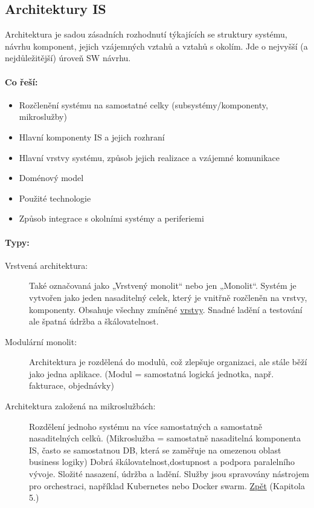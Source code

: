 \subsection{Architektury IS}
Architektura je sadou zásadních rozhodnutí týkajících se struktury 
systému, návrhu komponent, jejich vzájemných vztahů a vztahů s okolím.
Jde o nejvyšší (a nejdůležitější) úroveň SW návrhu.

\paragraph*{Co řeší:}
\begin{itemize}
    \item Rozčlenění systému na samostatné celky (subsystémy/komponenty, mikroslužby)
    \item Hlavní komponenty IS a jejich rozhraní
    \item Hlavní vrstvy systému, způsob jejich realizace a vzájemné komunikace
    \item Doménový model
    \item Použité technologie
    \item Způsob integrace s okolními systémy a periferiemi
\end{itemize}
\paragraph*{Typy:}
\begin{description}
    \item[Vrstvená architektura:] Také označovaná jako „Vrstvený monolit“ nebo jen „Monolit“.
    Systém je vytvořen jako jeden nasaditelný celek, který je 
    vnitřně rozčleněn na vrstvy, komponenty. Obsahuje všechny zmíněné \hyperref[sub:vrstvy]{vrstvy}.
    Snadné ladění a testování ale špatná údržba a škálovatelnost.
    \item[Modulární monolit:] Architektura je rozdělená do modulů, což zlepšuje
    organizaci, ale stále běží jako jedna aplikace. 
    (Modul = samostatná logická jednotka, např. fakturace, objednávky)
    \item[Architektura založená na mikroslužbách:] Rozdělení jednoho 
    systému na více samostatných a samostatně nasaditelných celků.
    (Mikroslužba = samostatně nasaditelná komponenta IS, často se samostatnou DB, která se zaměřuje na omezenou oblast business logiky)
    Dobrá škálovatelnost,dostupnost a podpora paralelního vývoje.
    Složité nasazení, údržba a ladění.
    Služby jsou spravovány nástrojem pro orchestraci, například 
    Kubernetes nebo Docker swarm.
    \label{sub:mikrosluzby}
    \hyperref[sub:mikrosluzby2]{Zpět} (Kapitola 5.)
\end{description}


